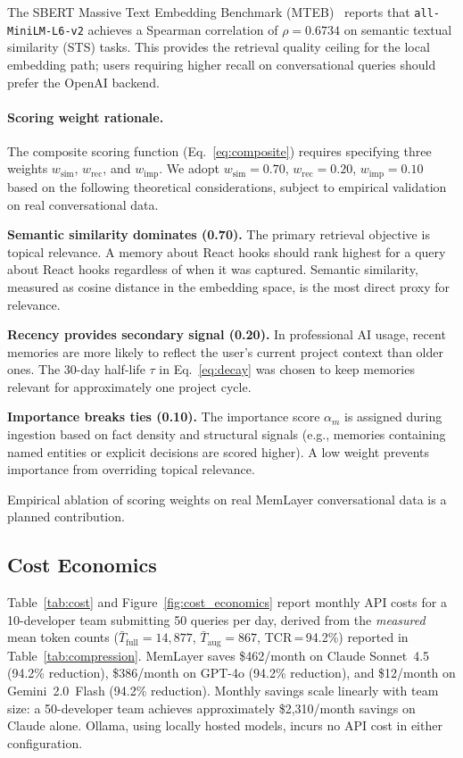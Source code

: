 \documentclass[10pt,twocolumn]{article}
\begin{document}
The SBERT Massive Text Embedding Benchmark (MTEB)~\citep{muennighoff2022mteb}
reports that \texttt{all-MiniLM-L6-v2} achieves a Spearman correlation of
$\rho = 0.6734$ on semantic textual similarity (STS) tasks. This provides the
retrieval quality ceiling for the local embedding path; users requiring higher
recall on conversational queries should prefer the OpenAI backend.

\paragraph{Scoring weight rationale.}
The composite scoring function (Eq.~\ref{eq:composite}) requires specifying
three weights $w_{\text{sim}}$, $w_{\text{rec}}$, and $w_{\text{imp}}$.  We
adopt $w_{\text{sim}}{=}0.70$, $w_{\text{rec}}{=}0.20$,
$w_{\text{imp}}{=}0.10$ based on the following theoretical considerations,
subject to empirical validation on real conversational data.

\textbf{Semantic similarity dominates (0.70).} The primary retrieval objective
is topical relevance. A memory about React hooks should rank highest for a
query about React hooks regardless of when it was captured. Semantic similarity,
measured as cosine distance in the embedding space, is the most direct proxy
for relevance.

\textbf{Recency provides secondary signal (0.20).} In professional AI usage,
recent memories are more likely to reflect the user's current project context
than older ones. The 30-day half-life $\tau$ in Eq.~\ref{eq:decay} was chosen
to keep memories relevant for approximately one project cycle.

\textbf{Importance breaks ties (0.10).} The importance score $\alpha_m$ is
assigned during ingestion based on fact density and structural signals (e.g.,
memories containing named entities or explicit decisions are scored higher). A
low weight prevents importance from overriding topical relevance.

Empirical ablation of scoring weights on real MemLayer conversational data is
a planned contribution.

\subsection{Cost Economics}
\label{sec:cost}

\noindent
Table~\ref{tab:cost} and Figure~\ref{fig:cost_economics} report monthly API
costs for a 10-developer team submitting 50 queries per day, derived from the
\emph{measured} mean token counts ($\bar{T}_{\text{full}}{=}14{,}877$,
$\bar{T}_{\text{aug}}{=}867$, TCR\,=\,94.2\%) reported in
Table~\ref{tab:compression}.
MemLayer saves \$462/month on Claude Sonnet~4.5 (94.2\% reduction),
\$386/month on GPT-4o (94.2\% reduction), and \$12/month on
Gemini~2.0~Flash (94.2\% reduction). Monthly savings scale linearly with
team size: a 50-developer team achieves approximately \$2{,}310/month savings
on Claude alone. Ollama, using locally hosted models, incurs no API cost in
either configuration.
\end{document}
